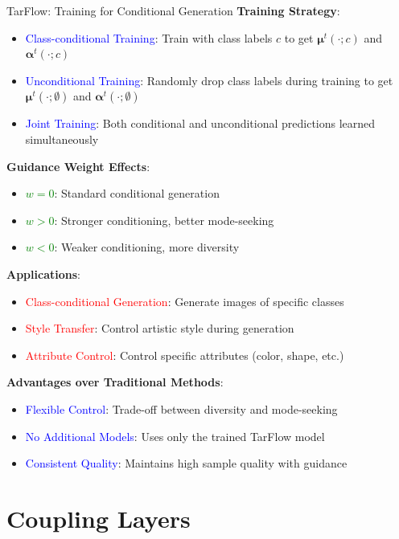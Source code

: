 \documentclass[aspectratio=169]{beamer}
\begin{document}
\begin{frame}{TarFlow: Training for Conditional Generation}
\textbf{Training Strategy}:
\begin{itemize}
    \item \textcolor{blue}{Class-conditional Training}: Train with class labels $c$ to get $\boldsymbol{\mu}^t(\cdot; c)$ and $\boldsymbol{\alpha}^t(\cdot; c)$
    \item \textcolor{blue}{Unconditional Training}: Randomly drop class labels during training to get $\boldsymbol{\mu}^t(\cdot; \emptyset)$ and $\boldsymbol{\alpha}^t(\cdot; \emptyset)$
    \item \textcolor{blue}{Joint Training}: Both conditional and unconditional predictions learned simultaneously
\end{itemize}

\textbf{Guidance Weight Effects}:
\begin{itemize}
    \item \textcolor{green}{$w = 0$}: Standard conditional generation
    \item \textcolor{green}{$w > 0$}: Stronger conditioning, better mode-seeking
    \item \textcolor{green}{$w < 0$}: Weaker conditioning, more diversity
\end{itemize}

\textbf{Applications}:
\begin{itemize}
    \item \textcolor{red}{Class-conditional Generation}: Generate images of specific classes
    \item \textcolor{red}{Style Transfer}: Control artistic style during generation
    \item \textcolor{red}{Attribute Control}: Control specific attributes (color, shape, etc.)
\end{itemize}

\textbf{Advantages over Traditional Methods}:
\begin{itemize}
    \item \textcolor{blue}{Flexible Control}: Trade-off between diversity and mode-seeking
    \item \textcolor{blue}{No Additional Models}: Uses only the trained TarFlow model
    \item \textcolor{blue}{Consistent Quality}: Maintains high sample quality with guidance
\end{itemize}
\end{frame}


\section{Coupling Layers}
\end{document}
